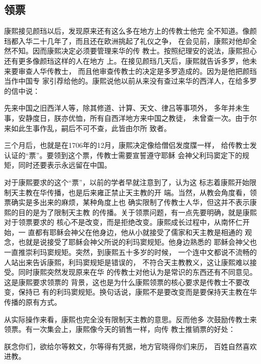 \subsection{领票}
\par
康熙接见颜珰以后，发现原来还有这么多在地方上的传教士他完%
全不知道。像颜珰都入华二十几年了，而且还在欧洲挑起了礼仪之争，%
在会见前，康熙对他却全然不知。因而康熙决定必须要管理来华的传%
教士。按照纪理安的说法，康熙担心还有更多像颜珰这样的人在地方%
上。在接见颜珰几天后，康熙就告诉多罗，他未来要审查人华传教士，%
而且他审查传教士的决定是多罗造成的。因为是他把颜珰当作中国专%
家引荐给他的。康熙说他以前从来没有查过来华的西洋人，在给多罗%
的信中说：%
\par
{\bookkai 先来中国之旧西洋人等，除其修道、计算、天文、律吕等事项外，}%
{\bookkai 多年并未生事，安静度日，朕亦优恤，所有自西洋地方来中国之教徒，}%
{\bookkai 未曾查一次。由于尔来如此生事作乱，嗣后不可不查，此皆由尔所}%
{\bookkai 致者。}%
\par
三个月后，也就是在1706年的12月，康熙决定像给僧侣发度牒一样，%
给传教士发认证的“票”。要领到这个票，传教士需要宣誓遵守耶稣%
会神父利玛窦定下的规矩，同时还要表示永远留在中国。%
\par
对于康熙要求的这个“票”，以前的学者早就注意到了，认为这%
标志着康熙开始限制天主教在华传播，也是后来雍正禁止天主教的开%
端。当然，从教会角度看，领票确实是多出来的麻烦，某种角度上也%
确实限制了传教士人华，但这并不表示康熙的目的是为了限制天主教%
的传播。关于领票问题，有一点先要明确，就是康熙对于领票要求的%
核心不是改变，而是拒绝改变。康熙成长过程中，从南怀仁开始，一%
直都有耶稣会神父在他身边，他从小就接受了儒家和天主教是相通的%
观念，也就是说接受了耶稣会神父所说的利玛窦规矩。他身边熟悉的%
耶稣会神父也一直推崇利玛窦规矩。突然，到康熙五十多岁的时候，%
一个连中文都说不流畅的人站出来告诉康熙，利玛窦规矩是错误的，%
不符合天主教教义，这让康熙难以接受。同时康熙突然发现原来在华%
的传教士对他认为是常识的东西还有不同意见。这是康熙要求领票的%
背景，这也是为什么康熙领票的核心要求是传教士不要改变，保持已%
有的利玛窦规矩。换句话说，康熙不是要改变而是要保持天主教在华%
传播的原有方式。%
\par
从实际操作来看，康熙也完全没有限制天主教的意思。反而他多%
次鼓励传教士来领票。有一次集会上，康熙像今天的销售一样，向传%
教士推销票的好处：%
\par
{\bookkai 朕念你们，欲给尔等敕文，尔等得有凭据，地方官晓得你们来历，}%
{\bookkai 百姓自然喜欢进教。}{\bookkai {}}%
